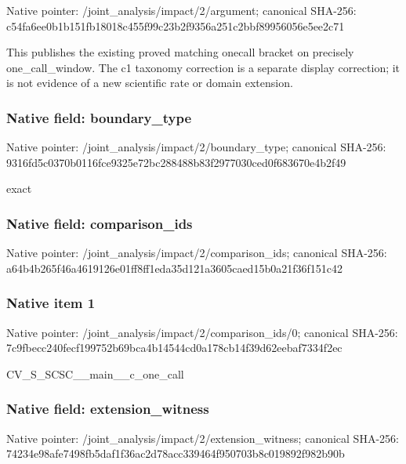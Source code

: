 \documentclass[10pt,a4paper]{article}
\begin{document}
Native pointer: /joint\_analysis/impact/2/argument; canonical SHA-256: c54fa6ee0b1b151fb18018c4\allowbreak{}55f99c23b2f9356a251c2bbf\allowbreak{}89956056e5ee2c71


This publishes the existing proved matching onecall bracket on precisely one\_call\_window. The c1 taxonomy correction is a separate display correction; it is not evidence of a new scientific rate or domain extension.


\subsubsection{Native field: boundary\_type}


Native pointer: /joint\_analysis/impact/2/boundary\_type; canonical SHA-256: 9316fd5c0370b0116fce9325\allowbreak{}e72bc288488b83f2977030ce\allowbreak{}d0f683670e4b2f49


exact


\subsubsection{Native field: comparison\_ids}


Native pointer: /joint\_analysis/impact/2/comparison\_ids; canonical SHA-256: a64b4b265f46a4619126e01f\allowbreak{}f8ff1eda35d121a3605caed1\allowbreak{}5b0a21f36f151c42



\subsubsection{Native item 1}


Native pointer: /joint\_analysis/impact/2\allowbreak{}/comparison\_ids/0; canonical SHA-256: 7c9fbecc240fecf199752b69\allowbreak{}bca4b14544cd0a178cb14f39\allowbreak{}d62eebaf7334f2ec


CV\_S\_SCSC\_\_main\_\_c\_one\_call


\subsubsection{Native field: extension\_witness}


Native pointer: /joint\_analysis/impact/2\allowbreak{}/extension\_witness; canonical SHA-256: 74234e98afe7498fb5daf1f3\allowbreak{}6ac2d78acc339464f950703b\allowbreak{}8c019892f982b90b
\end{document}
